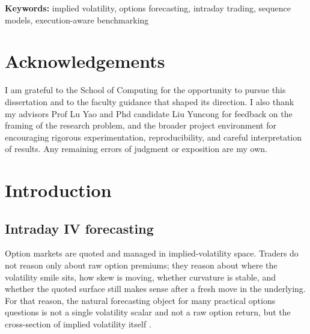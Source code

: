 \documentclass[12pt]{report}
\begin{document}
\noindent\textbf{Keywords:} implied volatility, options forecasting, intraday trading, sequence models, execution-aware benchmarking


\cleardoublepage
\chapter*{Acknowledgements}
I am grateful to the School of Computing for the opportunity to pursue this dissertation and to the faculty guidance that shaped its direction. I also thank my advisors Prof Lu Yao and Phd candidate Liu Yuncong for feedback on the framing of the research problem, and the broader project environment for encouraging rigorous experimentation, reproducibility, and careful interpretation of results. Any remaining errors of judgment or exposition are my own.

\cleardoublepage
\begingroup
\setlength{\parskip}{0pt}
\setlength{\itemsep}{0pt}
\renewcommand{\baselinestretch}{0.95}

\tableofcontents
\endgroup

\cleardoublepage
\setcounter{page}{1}
\hypersetup{pageanchor=true}

\chapter{Introduction}

\section{Intraday IV forecasting}
Option markets are quoted and managed in implied-volatility space. Traders do not reason only about raw option premiums; they reason about where the volatility smile sits, how skew is moving, whether curvature is stable, and whether the quoted surface still makes sense after a fresh move in the underlying. For that reason, the natural forecasting object for many practical options questions is not a single volatility scalar and not a raw option return, but the cross-section of implied volatility itself \citep{black1973,dumas1998,cont2002dynamics}.
\end{document}
